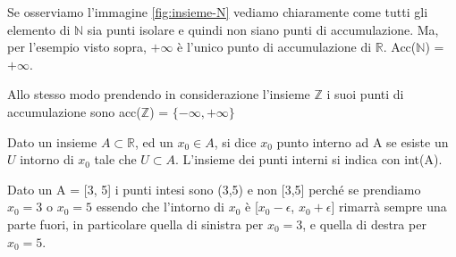 Se osserviamo l'immagine \ref{fig:insieme-N} vediamo chiaramente come tutti gli elemento di $\mathbb{N}$ sia punti isolare e quindi non siano punti di accumulazione. Ma, per l'esempio visto sopra, $+\infty$ è l'unico punto di accumulazione di $\mathbb{R}$. Acc($\mathbb{N}$) = $+\infty$. \\
\begin{note}
    Allo stesso modo prendendo in considerazione l'insieme $\mathbb{Z}$ i suoi punti di accumulazione sono acc($\mathbb{Z}$) = $\{-\infty, +\infty\}$
\end{note}
\begin{definition}
    Dato un insieme $A \subset \mathbb{R}$, ed un $x_0 \in A$, si dice $x_0$ punto interno ad A se esiste un $U$ intorno di $x_0$ tale che $U \subset A$. L'insieme dei punti interni si indica con int(A).
\end{definition}
\begin{example}
    Dato un A = [3, 5] i punti intesi sono (3,5) e non [3,5] perché se prendiamo $x_0 = 3$ o $x_0 = 5$ essendo che l'intorno di $x_0$ è [$x_0 - \epsilon$, $x_0 + \epsilon$] rimarrà sempre una parte fuori, in particolare quella di sinistra per $x_0 = 3$, e quella di destra per $x_0 = 5$.
\end{example}

